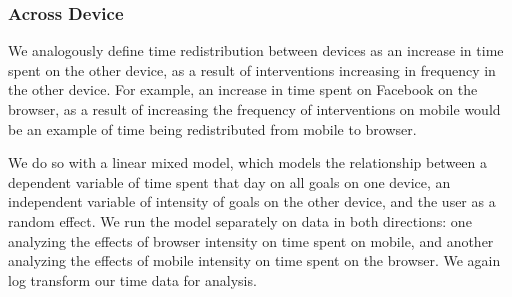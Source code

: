 
\subsubsection{Across Device}

We analogously define time redistribution between devices as an increase in time spent on the other device, as a result of interventions increasing in frequency in the other device. For example, an increase in time spent on Facebook on the browser, as a result of increasing the frequency of interventions on mobile would be an example of time being redistributed from mobile to browser.

We do so with a linear mixed model, which models the relationship between a dependent variable of time spent that day on all goals on one device, an independent variable of intensity of goals on the other device, and the user as a random effect. We run the model separately on data in both directions: one analyzing the effects of browser intensity on time spent on mobile, and another analyzing the effects of mobile intensity on time spent on the browser. We again log transform our time data for analysis.


